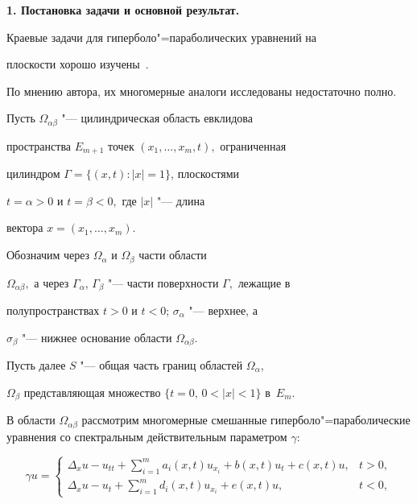 \bigskip



\textbf{1. Постановка задачи и основной результат.} 

Краевые задачи для гиперболо"=параболических уравнений на

плоскости хорошо изучены~\cite{aldash:1}. 

По мнению автора, их многомерные аналоги  \cite{aldash:2, aldash:3, aldash:4} исследованы недостаточно полно.



Пусть $\Omega_{\alpha\beta} $  "--- цилиндрическая область евклидова

пространства $E_{m+1}$ точек $(x_{1}, \dots, x_{m} ,t),$ ограниченная

цилиндром $\Gamma = \{(x,t):  |x|=1 \}$, плоскостями

$t=\alpha>0$ и $t=\beta<0,$ где ${\left| {x}\right|} $ "---  длина

вектора $x = (x_{1},\dots ,x_{m}).$



Обозначим через  $\Omega_\alpha$ и $\Omega_\beta$  части области

$\Omega_{\alpha \beta},$ а через $\Gamma_\alpha$,  $\Gamma_\beta$ "--- части поверхности $\Gamma,$  лежащие в

полупространствах $t>0$ и  $t<0$; $\sigma_\alpha$ "--- верхнее, а

$\sigma_\beta$ "--- нижнее основание области $\Omega_{\alpha \beta}.$



Пусть далее $S$ "--- общая часть границ областей $\Omega_\alpha$,

$\Omega_\beta$ представляющая множество $\{t=0, \, 0<|x|<1\}$  в~$E_m.$



В области $\Omega_{\alpha\beta}$ рассмотрим многомерные смешанные гиперболо"=параболические уравнения со спектральным действительным параметром $\gamma$:

\begin{equation}

\gamma u =

\left\{\begin{array}{ll}\Delta_x u- u_{tt} + \sum\limits_{i=1}^m a_i(x,t)u_{x_i}+ b(x,t)u_t + c(x,t)u,& t>0,\\

\Delta_x u - u_{t}+ \sum\limits_{i=1}^m d_i(x,t)u_{x_i}+

e(x,t)u, & t<0, \end{array} \right.

\label{ald:eq1}

\end{equation}

